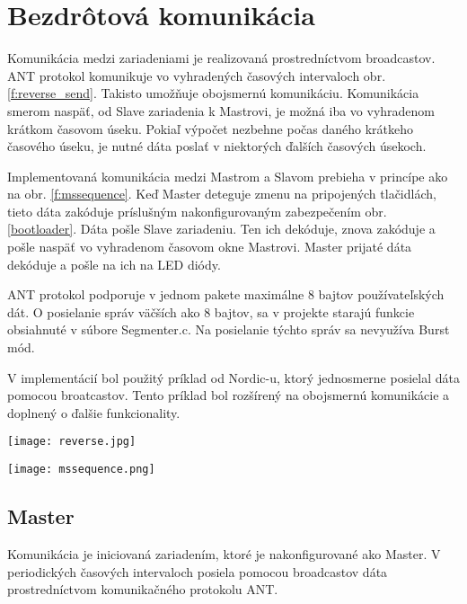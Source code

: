 \documentclass[12pt,a4paper,oneside,openright]{report}
\begin{document}
\section{Bezdrôtová komunikácia}
Komunikácia medzi zariadeniami je realizovaná prostredníctvom broadcastov. 
ANT protokol komunikuje vo vyhradených časových intervaloch obr. \ref{f:reverse_send}. Takisto umožňuje obojsmernú komunikáciu. Komunikácia smerom naspäť, od Slave zariadenia k Mastrovi, je možná iba vo vyhradenom krátkom časovom úseku. Pokiaľ výpočet nezbehne počas daného krátkeho časového úseku, je nutné dáta poslať v niektorých ďalších časových úsekoch.

Implementovaná komunikácia medzi Mastrom a Slavom prebieha v princípe ako na obr. \ref{f:mssequence}. Keď Master deteguje zmenu na pripojených tlačidlách, tieto dáta zakóduje príslušným nakonfigurovaným zabezpečením obr. \ref{bootloader}. Dáta pošle Slave zariadeniu. Ten ich dekóduje, znova zakóduje a pošle naspäť vo vyhradenom časovom okne Mastrovi. Master prijaté dáta dekóduje a pošle na ich na LED diódy.

ANT protokol podporuje v jednom pakete maximálne 8 bajtov používateľských dát. O posielanie správ väčších ako 8 bajtov, sa v projekte starajú funkcie obsiahnuté v súbore Segmenter.c. Na posielanie týchto správ sa nevyužíva Burst mód.

V implementácií bol použitý príklad od Nordic-u, ktorý jednosmerne posielal dáta pomocou broatcastov. Tento príklad bol rozšírený na obojsmernú komunikácie a doplnený o ďalšie funkcionality.

	\begin{figure*}[h]
		\centering
		\texttt{[image: reverse.jpg]}
		\caption{Obojsmerná komunikácia po ANT protokole \cite{ANT}.}
		\label{f:reverse_send}
	\end{figure*}


	\begin{figure*}[h]
		\centering
		\texttt{[image: mssequence.png]}
		\caption{Komunikácia medzi Master a Slave zariadením.}
		\label{f:mssequence}
	\end{figure*}

\subsection{Master}
	Komunikácia je iniciovaná zariadením, ktoré je nakonfigurované ako Master.
	V periodických časových intervaloch posiela pomocou broadcastov dáta prostredníctvom komunikačného protokolu ANT.
	
\end{document}
